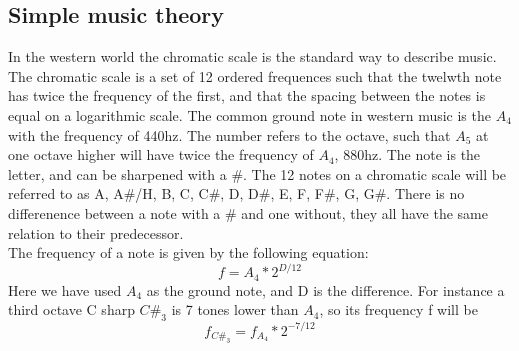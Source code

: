 \subsection{Simple music theory}
In the western world the chromatic scale is the standard way to describe music. The chromatic scale is a set of 12 ordered frequences such that the twelwth note has twice the frequency of the first, and that the spacing between the notes is equal on a logarithmic scale. The common ground note in western music is the $A_{4}$ with the frequency of 440hz. The number refers to the octave, such that $A_{5}$ at one octave higher will have twice the frequency of $A_{4}$, 880hz. The note is the letter, and can be sharpened with a \#. The 12 notes on a chromatic scale will be referred to as A, A\#/H, B, C, C\#, D, D\#, E, F, F\#, G, G\#. There is no differenence between a note with a \# and one without, they all have the same relation to their predecessor. \\
The frequency of a note is given by the following equation: $$f = A_{4}*2^{D/12}$$
Here we have used $A_4$ as the ground note, and D is the difference. For instance a third octave C sharp $C\#_3$ is 7 tones lower than $A_4$, so its frequency f will be $$f_{C\#_{3}} = f_{A_{4}}*2^{-7/12}$$
